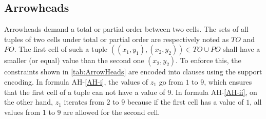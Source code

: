 \clearpage

\subsection{Arrowheads}\label{Encoding:Arrowheads}
Arrowheads demand a total or partial order between two cells. The sets of all tuples of two cells under total or partial order are respectively noted as $TO$ and $PO$. The first cell of such a tuple  $((x_1,y_1), (x_2,y_2)) \in TO \cup PO$ shall have a smaller (or equal) value than the second one $(x_2,y_2)$. To enforce this, the constraints shown in \ref{tab:ArrowHeads} are encoded into clauses using the support encoding. In formula AH-\ref{AH-i}, the values of $z_1$ go from $1$ to $9$, which ensures that the first cell of a tuple can not have a value of 9. In formula AH-\ref{AH-ii}, on the other hand, $z_1$ iterates from $2$ to $9$ because if the first cell has a value of $1$, all values from $1$ to $9$ are allowed for the second cell.\\

